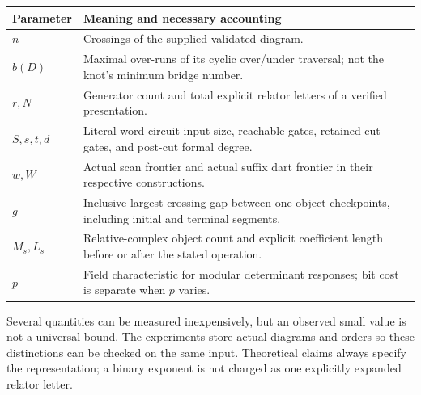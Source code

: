\begin{center}\small
\begin{tabularx}{\textwidth}{@{}lY@{}}
\toprule
Parameter & Meaning and necessary accounting\\
\midrule
$n$ & Crossings of the supplied validated diagram.\\
$b(D)$ & Maximal over-runs of its cyclic over/under traversal; not the knot's minimum bridge number.\\
$r,N$ & Generator count and total explicit relator letters of a verified presentation.\\
$S,s,t,d$ & Literal word-circuit input size, reachable gates, retained cut gates, and post-cut formal degree.\\
$w,W$ & Actual scan frontier and actual suffix dart frontier in their respective constructions.\\
$g$ & Inclusive largest crossing gap between one-object checkpoints, including initial and terminal segments.\\
$M_s,L_s$ & Relative-complex object count and explicit coefficient length before or after the stated operation.\\
$p$ & Field characteristic for modular determinant responses; bit cost is separate when $p$ varies.\\
\bottomrule
\end{tabularx}\end{center}

Several quantities can be measured inexpensively, but an observed small
value is not a universal bound. The experiments store actual diagrams and
orders so these distinctions can be checked on the same input. Theoretical
claims always specify the representation; a binary exponent is not charged
as one explicitly expanded relator letter.
